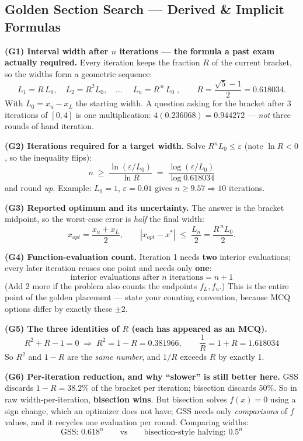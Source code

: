 \subsection{Golden Section Search --- Derived \& Implicit Formulas}

\begin{derivedbox}
\textbf{(G1) Interval width after $n$ iterations --- the formula a past exam actually required.}
Every iteration keeps the fraction $R$ of the current bracket, so the widths form a geometric sequence:
\[
L_1 = R\,L_0,\quad L_2 = R^2L_0,\quad\dots\quad
\boxed{\;L_n = R^{\,n}\,L_0\;},\qquad R = \frac{\sqrt5-1}{2} = 0.618034 .
\]
With $L_0 = x_u - x_L$ the starting width. A question asking for the bracket after 3 iterations of $[0,4]$ is one multiplication: $4(0.236068) = 0.944272$ --- \emph{not} three rounds of hand iteration.

\smallskip
\textbf{(G2) Iterations required for a target width.} Solve $R^nL_0 \le \varepsilon$ (note $\ln R < 0$, so the inequality flips):
\[
\boxed{\;n \;\ge\; \frac{\ln(\varepsilon/L_0)}{\ln R} \;=\; \frac{\log(\varepsilon/L_0)}{\log 0.618034}\;}
\]
and round \emph{up}. Example: $L_0 = 1$, $\varepsilon = 0.01$ gives $n \ge 9.57 \Rightarrow 10$ iterations.

\smallskip
\textbf{(G3) Reported optimum and its uncertainty.} The answer is the bracket midpoint, so the worst-case error is \emph{half} the final width:
\[
x_{opt} = \frac{x_u+x_L}{2}, \qquad |x_{opt} - x^\ast| \;\le\; \frac{L_n}{2} = \frac{R^{\,n}L_0}{2}.
\]

\smallskip
\textbf{(G4) Function-evaluation count.} Iteration 1 needs \textbf{two} interior evaluations; every later iteration reuses one point and needs only \textbf{one}:
\[
\boxed{\text{interior evaluations after } n \text{ iterations} = n+1}
\]
(Add 2 more if the problem also counts the endpoints $f_L, f_u$.) This is the entire point of the golden placement --- state your counting convention, because MCQ options differ by exactly these $\pm2$.

\smallskip
\textbf{(G5) The three identities of $R$ (each has appeared as an MCQ).}
\[
R^2 + R - 1 = 0 \;\Longrightarrow\;
\boxed{R^2 = 1-R = 0.381966}, \qquad
\boxed{\frac1R = 1+R = 1.618034}
\]
So $R^2$ and $1-R$ are the \emph{same number}, and $1/R$ exceeds $R$ by exactly 1.

\smallskip
\textbf{(G6) Per-iteration reduction, and why ``slower'' is still better here.}
GSS discards $1-R = 38.2\%$ of the bracket per iteration; bisection discards $50\%$. So in raw width-per-iteration, \textbf{bisection wins}. But bisection solves $f(x)=0$ using a sign change, which an optimizer does not have; GSS needs only \emph{comparisons} of $f$ values, and it recycles one evaluation per round. Comparing widths:
\[
\text{GSS: } 0.618^n \qquad\text{vs}\qquad \text{bisection-style halving: } 0.5^n
\]


\end{derivedbox}
